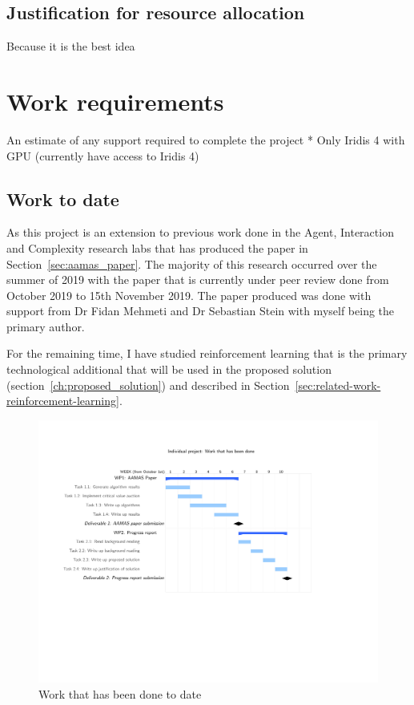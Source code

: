 \documentclass[sotoncolour]{uosproject}     %
\begin{document}
\section{Justification for resource allocation} \label{sec:just_resource_allocation}
Because it is the best idea


\chapter{Work requirements}\label{ch:work-requirements}
An estimate of any support required to complete the project
* Only Iridis 4 with GPU (currently have access to Iridis 4)

\section{Work to date}\label{sec:work-to-date}
As this project is an extension to previous work done in the Agent, Interaction and Complexity research labs that has
produced the paper in Section~\ref{sec:aamas_paper}. The majority of this research occurred over the summer of 2019
with the paper that is currently under peer review done from October 2019 to 15th November 2019. The paper produced
was done with support from Dr Fidan Mehmeti and Dr Sebastian Stein with myself being the primary author.

For the remaining time, I have studied reinforcement learning that is the primary technological additional that will
be used in the proposed solution (section~\ref{ch:proposed_solution}) and described in
Section~\ref{sec:related-work-reinforcement-learning}.

\begin{figure}
    \centering
    \includegraphics[width=\linewidth]{past_work_grantt/past_grantt.pdf}
    \caption{Work that has been done to date}
    \label{fig:past_grantt}
\end{figure}
\end{document}
